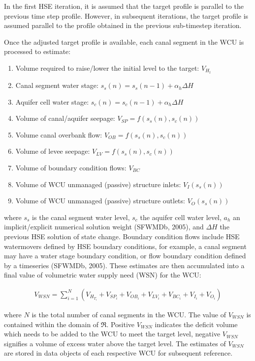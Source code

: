 In the first HSE iteration, it is assumed that the target profile is
parallel to the previous time step profile. However, in subsequent
iterations, the target profile is assumed parallel to the profile
obtained in the previous sub-timestep iteration. 

Once the adjusted target profile is available, each canal segment in
the WCU is processed to estimate:

\begin{enumerate}
 \item Volume required to raise/lower the initial level to the target:
   $V_{H_t}$
 \item Canal segment water stage: $s_s(n) = s_s(n - 1) + \alpha_h \Delta H$ 
 \item Aquifer cell water stage: $s_c(n) = s_c(n - 1) + \alpha_h\Delta H$ 
 \item Volume of canal/aquifer seepage: $V_{SP} = f(s_s(n), s_c(n))$ 
 \item Volume canal overbank flow: $V_{OB} = f(s_s(n), s_c(n))$ 
 \item Volume of levee seepage: $V_{LV} = f(s_s(n), s_c(n))$ 
 \item Volume of boundary condition flows: $V_{BC}$ 
 \item Volume of WCU unmanaged (passive) structure inlets: $V_I (s_s(n))$ 
 \item Volume of WCU unmanaged (passive) structure outlets: $V_O(s_s(n))$
\end{enumerate}
 
where $s_s$ is the canal segment water level, $s_c$ the aquifer cell
water level, $a_h$ an implicit/explicit numerical solution weight
(SFWMDb, 2005)\nocite{sfwmdb:2005}, and $\Delta H$ the previous HSE
solution of state change. Boundary condition flows include HSE
watermovers defined by HSE boundary conditions, for example, a canal
segment may have a water stage boundary condition, or flow boundary
condition defined by a timeseries (SFWMDb,
2005)\nocite{sfwmdb:2005}. These estimates are then accumulated into a
final value of volumetric water supply need (WSN) for the WCU:

\begin{align} \label{eqn:wsn}
  V_{WSN} = \sum_{i=1}^{N} (V_{H_{T_i}} + V_{SP_i} + V_{OB_i} + V_{LV_i} + V_{BC_i} + V_{I_i} + V_{O_i})
\end{align}

where $N$ is the total number of canal segments in the WCU. The value
of $V_{WSN}$ is contained within the domain of $\Re$. Positive
$V_{WSN}$ indicates the deficit volume which needs to be added to the
WCU to meet the target level, negative $V_{WSN}$ signifies a volume of
excess water above the target level. The estimates of $V_{WSN}$ are
stored in data objects of each respective WCU for subsequent
reference.

